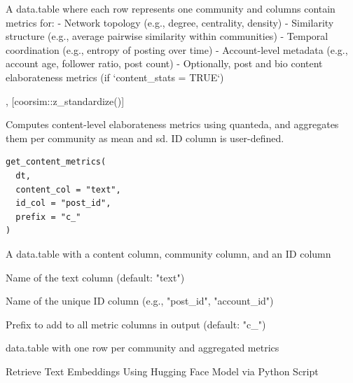 \documentclass[a4paper]{book}
\begin{document}
%
\begin{Value}
A data.table where each row represents one community and columns contain
metrics for:
- Network topology (e.g., degree, centrality, density)
- Similarity structure (e.g., average pairwise similarity within communities)
- Temporal coordination (e.g., entropy of posting over time)
- Account-level metadata (e.g., account age, follower ratio, post count)
- Optionally, post and bio content elaborateness metrics (if `content\_stats = TRUE`)
\end{Value}
%
\begin{SeeAlso}
, [coorsim::z\_standardize()]
\end{SeeAlso}
%
\begin{Description}
Computes content-level elaborateness metrics using quanteda, and
aggregates them per community as mean and sd. ID column is user-defined.
\end{Description}
%
\begin{Usage}
\begin{verbatim}
get_content_metrics(
  dt,
  content_col = "text",
  id_col = "post_id",
  prefix = "c_"
)
\end{verbatim}
\end{Usage}
%
\begin{Arguments}
\begin{ldescription}
\item[\code{dt}] A data.table with a content column, community column, and an ID column

\item[\code{content\_col}] Name of the text column (default: "text")

\item[\code{id\_col}] Name of the unique ID column (e.g., "post\_id", "account\_id")

\item[\code{prefix}] Prefix to add to all metric columns in output (default: "c\_")
\end{ldescription}
\end{Arguments}
%
\begin{Value}
data.table with one row per community and aggregated metrics
\end{Value}
%
\begin{Description}
Retrieve Text Embeddings Using Hugging Face Model via Python Script
\end{Description}
\end{document}
